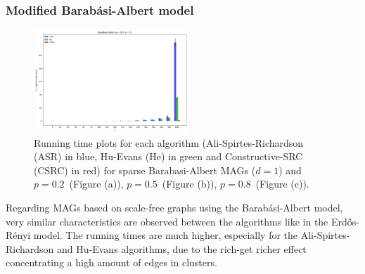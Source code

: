 \documentclass[a4paper]{article}
\begin{document}
\pagebreak

\subsubsection{Modified Barab\'{a}si-Albert model}

\begin{figure}[htbp]
	\centering
	\hfill
	
	\includegraphics[width=0.52\textwidth]{figures/Figure_18.png}
	
	\caption{Running time plots for each algorithm (Ali-Spirtes-Richardson (ASR) in blue, Hu-Evans (He) in green and Constructive-SRC (CSRC) in red) for sparse Barabasi-Albert MAGs ($d=1$) and $p=0.2$~(Figure (a)), $p=0.5$~(Figure (b)), $p=0.8$~(Figure (c)).}
	\label{fig:sf-1}
\end{figure}

Regarding MAGs based on scale-free graphs using the Barab\'{a}si-Albert model, very similar characteristics are observed between the algorithms like in the Erd\H{o}s-R\'{e}nyi model. The running times are much higher, especially for the Ali-Spirtes-Richardson and Hu-Evans algorithms, due to the rich-get richer effect concentrating a high amount of edges in clusters.
\end{document}
